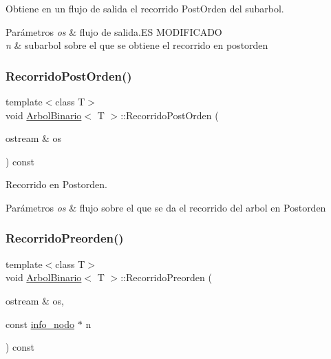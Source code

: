 Obtiene en un flujo de salida el recorrido Post\+Orden del subarbol. 


\begin{DoxyParams}{Parámetros}
{\em os} & flujo de salida.\+ES M\+O\+D\+I\+F\+I\+C\+A\+DO \\
\hline
{\em n} & subarbol sobre el que se obtiene el recorrido en postorden \\
\hline
\end{DoxyParams}
\mbox{\label{classArbolBinario_aa8380fa17126e49693942ddeadf3adc5}} 
\subsubsection{\texorpdfstring{Recorrido\+Post\+Orden()}{RecorridoPostOrden()}}
{\footnotesize\ttfamily template$<$class T$>$ \\
void \hyperlink{classArbolBinario}{Arbol\+Binario}$<$ T $>$\+::Recorrido\+Post\+Orden (\begin{DoxyParamCaption}\item[{ostream \&}]{os }\end{DoxyParamCaption}) const}



Recorrido en Postorden. 


\begin{DoxyParams}{Parámetros}
{\em os} & flujo sobre el que se da el recorrido del arbol en Postorden \\
\hline
\end{DoxyParams}
\mbox{\label{classArbolBinario_a1a7dd97d706bfcf3c60a4cca1352f79c}} 
\subsubsection{\texorpdfstring{Recorrido\+Preorden()}{RecorridoPreorden()}}
{\footnotesize\ttfamily template$<$class T$>$ \\
void \hyperlink{classArbolBinario}{Arbol\+Binario}$<$ T $>$\+::Recorrido\+Preorden (\begin{DoxyParamCaption}\item[{ostream \&}]{os,  }\item[{const \hyperlink{structArbolBinario_1_1info__nodo}{info\+\_\+nodo} $\ast$}]{n }\end{DoxyParamCaption}) const\hspace{0.3cm}{\ttfamily [private]}}



